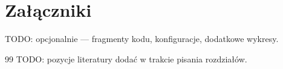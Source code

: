 \documentclass[12pt,twoside]{article}
\begin{document}
\section*{Załączniki}

TODO: opcjonalnie — fragmenty kodu, konfiguracje, dodatkowe wykresy.


\clearpage


\begin{thebibliography}{99}
 TODO: pozycje literatury dodać w trakcie pisania rozdziałów.
\end{thebibliography}

\clearpage

\makesummary
\end{document}
